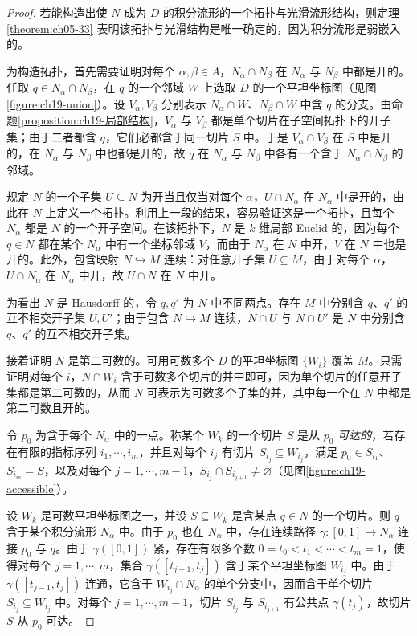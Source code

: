 \documentclass[../../main.tex]{subfiles}
\begin{document}
\begin{proof}
若能构造出使 $N$ 成为 $D$ 的积分流形的一个拓扑与光滑流形结构，则定理\cref{theorem:ch05-33} 表明该拓扑与光滑结构是唯一确定的，因为积分流形是弱嵌入的。

为构造拓扑，首先需要证明对每个 $\alpha,\beta\in A$，$N_\alpha\cap N_\beta$ 在 $N_\alpha$ 与 $N_\beta$ 中都是开的。任取 $q\in N_\alpha\cap N_\beta$，在 $q$ 的一个邻域 $W$ 上选取 $D$ 的一个平坦坐标图（见图\cref{figure:ch19-union}）。设 $V_\alpha,V_\beta$ 分别表示 $N_\alpha\cap W$、$N_\beta\cap W$ 中含 $q$ 的分支。由命题\cref{proposition:ch19-局部结构}，$V_\alpha$ 与 $V_\beta$ 都是单个切片在子空间拓扑下的开子集；由于二者都含 $q$，它们必都含于同一切片 $S$ 中。于是 $V_\alpha\cap V_\beta$ 在 $S$ 中是开的，在 $N_\alpha$ 与 $N_\beta$ 中也都是开的，故 $q$ 在 $N_\alpha$ 与 $N_\beta$ 中各有一个含于 $N_\alpha\cap N_\beta$ 的邻域。

规定 $N$ 的一个子集 $U\subseteq N$ 为开当且仅当对每个 $\alpha$，$U\cap N_\alpha$ 在 $N_\alpha$ 中是开的，由此在 $N$ 上定义一个拓扑。利用上一段的结果，容易验证这是一个拓扑，且每个 $N_\alpha$ 都是 $N$ 的一个开子空间。在该拓扑下，$N$ 是 $k$ 维局部 Euclid 的，因为每个 $q\in N$ 都在某个 $N_\alpha$ 中有一个坐标邻域 $V$，而由于 $N_\alpha$ 在 $N$ 中开，$V$ 在 $N$ 中也是开的。此外，包含映射 $N\hookrightarrow M$ 连续：对任意开子集 $U\subseteq M$，由于对每个 $\alpha$，$U\cap N_\alpha$ 在 $N_\alpha$ 中开，故 $U\cap N$ 在 $N$ 中开。

为看出 $N$ 是 Hausdorff 的，令 $q,q'$ 为 $N$ 中不同两点。存在 $M$ 中分别含 $q$、$q'$ 的互不相交开子集 $U,U'$；由于包含 $N\hookrightarrow M$ 连续，$N\cap U$ 与 $N\cap U'$ 是 $N$ 中分别含 $q$、$q'$ 的互不相交开子集。

接着证明 $N$ 是第二可数的。可用可数多个 $D$ 的平坦坐标图 $\{W_i\}$ 覆盖 $M$。只需证明对每个 $i$，$N\cap W_i$ 含于可数多个切片的并中即可，因为单个切片的任意开子集都是第二可数的，从而 $N$ 可表示为可数多个子集的并，其中每一个在 $N$ 中都是第二可数且开的。

令 $p_0$ 为含于每个 $N_\alpha$ 中的一点。称某个 $W_k$ 的一个切片 $S$ 是从 $p_0$ \emph{可达的}，若存在有限的指标序列 $i_1,\cdots ,i_m$，并且对每个 $i_j$ 有切片 $S_{i_j}\subseteq W_{i_j}$，满足 $p_0\in S_{i_1}$、$S_{i_m}=S$，以及对每个 $j=1,\cdots ,m-1$，$S_{i_j}\cap S_{i_{j+1}}\ne\varnothing$（见图\cref{figure:ch19-accessible}）。

设 $W_k$ 是可数平坦坐标图之一，并设 $S\subseteq W_k$ 是含某点 $q\in N$ 的一个切片。则 $q$ 含于某个积分流形 $N_\alpha$ 中。由于 $p_0$ 也在 $N_\alpha$ 中，存在连续路径 $\gamma\colon[0,1]\to N_\alpha$ 连接 $p_0$ 与 $q$。由于 $\gamma([0,1])$ 紧，存在有限多个数 $0=t_0<t_1<\cdots<t_m=1$，使得对每个 $j=1,\cdots ,m$，集合 $\gamma([t_{j-1},t_j])$ 含于某个平坦坐标图 $W_{i_j}$ 中。由于 $\gamma([t_{j-1},t_j])$ 连通，它含于 $W_{i_j}\cap N_\alpha$ 的单个分支中，因而含于单个切片 $S_{i_j}\subseteq W_{i_j}$ 中。对每个 $j=1,\cdots ,m-1$，切片 $S_{i_j}$ 与 $S_{i_{j+1}}$ 有公共点 $\gamma(t_j)$，故切片 $S$ 从 $p_0$ 可达。


\end{proof}
\end{document}
